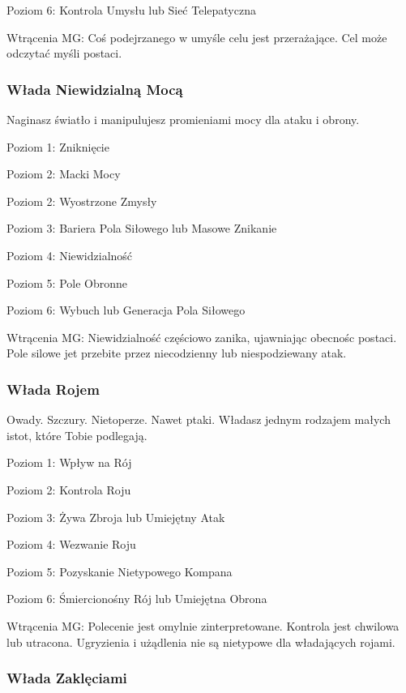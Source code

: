 Poziom 6: Kontrola Umysłu lub Sieć Telepatyczna

Wtrącenia MG: Coś podejrzanego w umyśle celu jest przerażające. Cel może odczytać myśli postaci.

\subsubsection{Włada Niewidzialną Mocą}

Naginasz światło i manipulujesz promieniami mocy dla ataku i obrony.

Poziom 1: Zniknięcie

Poziom 2: Macki Mocy

Poziom 2: Wyostrzone Zmysły

Poziom 3: Bariera Pola Siłowego lub Masowe Znikanie

Poziom 4: Niewidzialność

Poziom 5: Pole Obronne

Poziom 6: Wybuch lub Generacja Pola Siłowego

Wtrącenia MG: Niewidzialność częściowo zanika, ujawniając obecnośc postaci. Pole silowe jet przebite przez niecodzienny lub niespodziewany atak.

\subsubsection{Włada Rojem}

Owady. Szczury. Nietoperze. Nawet ptaki. Władasz jednym rodzajem małych istot, które Tobie podlegają. 

Poziom 1: Wpływ na Rój

Poziom 2: Kontrola Roju

Poziom 3: Żywa Zbroja lub Umiejętny Atak

Poziom 4: Wezwanie Roju

Poziom 5: Pozyskanie Nietypowego Kompana

Poziom 6: Śmiercionośny Rój lub Umiejętna Obrona

Wtrącenia MG: Polecenie jest omylnie zinterpretowane. Kontrola jest chwilowa lub utracona. Ugryzienia i użądlenia nie są nietypowe dla władających rojami.

\subsubsection{Włada Zaklęciami}

